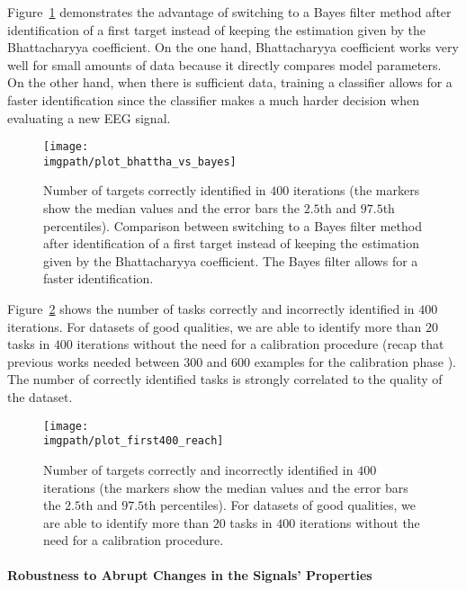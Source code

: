 Figure~\ref{fig:bhatta} demonstrates the advantage of switching to a Bayes filter method after identification of a first target instead of keeping the estimation given by the Bhattacharyya coefficient. On the one hand, Bhattacharyya coefficient works very well for small amounts of data because it directly compares model parameters. On the other hand, when there is sufficient data, training a classifier allows for a faster identification since the classifier makes a much harder decision when evaluating a new EEG signal.

\begin{figure}[!ht]
    \centering
        \texttt{[image: \\imgpath/plot\_bhattha\_vs\_bayes]}
        \caption{Number of targets correctly identified in $400$ iterations (the markers show the median values and the error bars the $2.5$th and $97.5$th percentiles). Comparison between switching to a Bayes filter method after identification of a first target instead of keeping the estimation given by the Bhattacharyya coefficient. The Bayes filter allows for a faster identification.}
        \label{fig:bhatta}
\end{figure} 

Figure~\ref{fig:avg_sum_400} shows the number of tasks correctly and incorrectly identified in $400$ iterations. For datasets of good qualities, we are able to identify more than $20$ tasks in $400$ iterations without the need for a calibration procedure (recap that previous works needed between 300 and 600 examples for the calibration phase \cite{chavarriaga2010learning,iturrate2010single}). The number of correctly identified tasks is strongly correlated to the quality of the dataset.

\begin{figure}[!ht]
    \centering
    \texttt{[image: \\imgpath/plot\_first400\_reach]} 
    \caption{Number of targets correctly and incorrectly identified in $400$ iterations (the markers show the median values and the error bars the $2.5$th and $97.5$th percentiles). For datasets of good qualities, we are able to identify more than $20$ tasks in $400$ iterations without the need for a calibration procedure.}
    \label{fig:avg_sum_400}
\end{figure} 

\paragraph{Robustness to Abrupt Changes in the Signals' Properties }
\label{CenterRobustnessToAbruptChangesInTheSignalsProperties}


